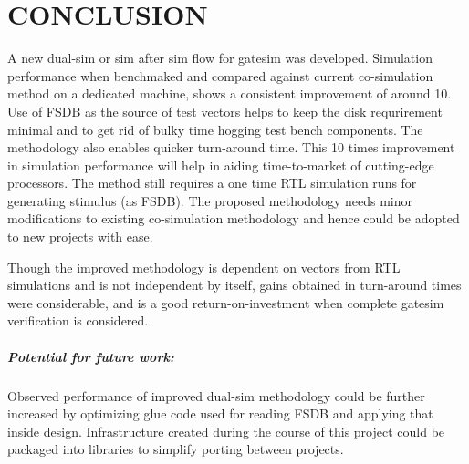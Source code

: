 \chapter{CONCLUSION}
\label{chap:conclusion}
A new dual-sim or sim after sim flow for gatesim was developed. Simulation performance when benchmaked and compared against current co-simulation method on a dedicated machine, shows a consistent improvement of around 10. Use of FSDB as the source of test vectors helps to keep the disk requrirement minimal and to get rid of bulky time hogging test bench components. The methodology also enables quicker turn-around time. This 10 times improvement in simulation performance will help in aiding time-to-market of cutting-edge processors. The method still requires a one time RTL simulation runs for generating stimulus (as FSDB). The proposed methodology needs minor modifications to existing co-simulation methodology and hence could be adopted to new projects with ease.

Though the improved methodology is dependent on vectors from RTL simulations and is not independent by itself, gains obtained in turn-around times were considerable, and is a good return-on-investment when complete gatesim verification is considered.

\paragraph{Potential for future work:}Observed performance of improved dual-sim methodology could be further increased by optimizing glue code used for reading FSDB and applying that inside design. Infrastructure created during the course of this project could be packaged into libraries to simplify porting between projects.
